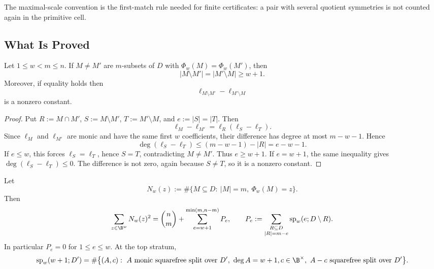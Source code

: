 The maximal-scale convention is the first-match rule needed for finite
certificates: a pair with several quotient symmetries is not counted again in
the primitive cell.

\subsection{What Is Proved}

\begin{proposition}
\label{prop:gf-sp-rigidity}
Let \(1\le w<m\le n\).  If \(M\ne M'\) are \(m\)-subsets of \(D\) with
\(\Phi_w(M)=\Phi_w(M')\), then
\[
        |M\setminus M'|=|M'\setminus M|\ge w+1.
\]
Moreover, if equality holds then
\[
        \ell_{M\setminus M'}-\ell_{M'\setminus M}
\]
is a nonzero constant.
\end{proposition}

\begin{proof}
Put \(R:=M\cap M'\), \(S:=M\setminus M'\), \(T:=M'\setminus M\), and
\(e:=|S|=|T|\).  Then
\[
        \ell_M-\ell_{M'}=\ell_R(\ell_S-\ell_T).
\]
Since \(\ell_M\) and \(\ell_{M'}\) are monic and have the same first \(w\)
coefficients, their difference has degree at most \(m-w-1\).  Hence
\[
        \deg(\ell_S-\ell_T)\le (m-w-1)-|R|=e-w-1.
\]
If \(e\le w\), this forces \(\ell_S=\ell_T\), hence \(S=T\), contradicting
\(M\ne M'\).  Thus \(e\ge w+1\).  If \(e=w+1\), the same inequality gives
\(\deg(\ell_S-\ell_T)\le0\).  The difference is not zero, again because
\(S\ne T\), so it is a nonzero constant.
\end{proof}

\begin{proposition}
\label{prop:gf-sp-second-moment}
Let
\[
        N_w(z):=\#\{M\subseteq D:\ |M|=m,\ \Phi_w(M)=z\}.
\]
Then
\[
\sum_{z\in\B^w} N_w(z)^2
 =
\binom{n}{m}
+\sum_{e=w+1}^{\min(m,n-m)} P_e,
\qquad
P_e:=
\sum_{\substack{R\subseteq D\\ |R|=m-e}}
\mathrm{sp}_w(e;D\setminus R).
\]
In particular \(P_e=0\) for \(1\le e\le w\).  At the top stratum,
\[
\mathrm{sp}_w(w+1;D')
=
\#\bigl\{(A,c):\ A \text{ monic squarefree split over }D',\ \deg A=w+1,
c\in\B^\times,\ A-c \text{ squarefree split over }D'\bigr\}.
\]
\end{proposition}

